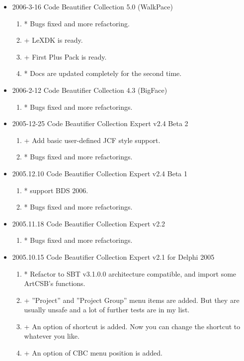 \begin{itemize}
\item 2006-3-16 Code Beautifier Collection 5.0 (WalkPace)
	\begin{enumerate}
	\item * Bugs fixed and more refactoring.
	\item + LeXDK is ready.
	\item + First Plus Pack is ready.
	\item * Docs are updated completely for the second time.
	\end{enumerate}

\item 2006-2-12 Code Beautifier Collection 4.3 (BigFace)
	\begin{enumerate}
	\item * Bugs fixed and more refactorings.
	\end{enumerate}

\item 2005-12-25 Code Beautifier Collection Expert v2.4 Beta 2
	\begin{enumerate}
	\item + Add basic user-defined JCF style support.
	\item * Bugs fixed and more refactorings.
	\end{enumerate}

\item 2005.12.10 Code Beautifier Collection Expert v2.4 Beta 1
	\begin{enumerate}
	\item * support BDS 2006.
	\item * Bugs fixed and more refactorings.
	\end{enumerate}

\item 2005.11.18 Code Beautifier Collection Expert v2.2
	\begin{enumerate}
	\item * Bugs fixed and more refactorings.
	\end{enumerate}

\item 2005.10.15 Code Beautifier Collection Expert v2.1 for Delphi 2005
	\begin{enumerate}
	\item * Refactor to SBT v3.1.0.0 architecture compatible, and import some ArtCSB's functions.
	\item + ''Project'' and ''Project Group'' menu items are added. But they are usually unsafe and a lot of further tests are in my list.
	\item + An option of shortcut is added. Now you can change the shortcut to whatever you like.
	\item + An option of CBC menu position is added.
	\end{enumerate}


\end{itemize}
